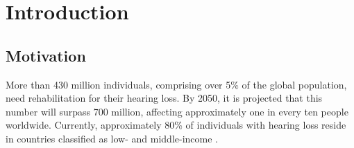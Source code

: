 \documentclass{l4proj}
\begin{document}
\tableofcontents

%
%
%
%
%
%
%
%
\chapter{Introduction}
\label{sec:intro}


\section{Motivation}
\label{sec:motivation}

More than 430 million individuals, comprising over 5\% of the global population, need rehabilitation for their hearing loss. By 2050, it is projected that this number will surpass 700 million, affecting approximately one in every ten people worldwide. Currently, approximately 80\% of individuals with hearing loss reside in countries classified as low- and middle-income \citep{Hapunda_2023}. 
\end{document}
